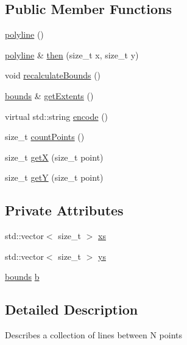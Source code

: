 \subsection*{Public Member Functions}
\begin{DoxyCompactItemize}
\item 
\hyperlink{classgraphics_1_1polyline_adbfa69d4679508481af8b7ad988c589f}{polyline} ()
\item 
\hyperlink{classgraphics_1_1polyline}{polyline} \& \hyperlink{classgraphics_1_1polyline_a611ffde054960b79df394c2fc957e25c}{then} (size\+\_\+t x, size\+\_\+t y)
\item 
void \hyperlink{classgraphics_1_1polyline_a43d93bfba6da374097c31d99fd4e6536}{recalculate\+Bounds} ()
\item 
\hyperlink{classgraphics_1_1bounds}{bounds} \& \hyperlink{classgraphics_1_1polyline_a5d1bb7507881d2d755d6779c9d7f8dbc}{get\+Extents} ()
\item 
virtual std\+::string \hyperlink{classgraphics_1_1polyline_a4b21b290bd04cccef24f8cb4a85299f2}{encode} ()
\item 
size\+\_\+t \hyperlink{classgraphics_1_1polyline_ab4556c8d21b8e07eaf1f3df023e032ac}{count\+Points} ()
\item 
size\+\_\+t \hyperlink{classgraphics_1_1polyline_af6fa13ff47cc4ba271583720dfca5af3}{getX} (size\+\_\+t point)
\item 
size\+\_\+t \hyperlink{classgraphics_1_1polyline_accded087eed0e5bcb72b4e22553aaa86}{getY} (size\+\_\+t point)
\end{DoxyCompactItemize}
\subsection*{Private Attributes}
\begin{DoxyCompactItemize}
\item 
std\+::vector$<$ size\+\_\+t $>$ \hyperlink{classgraphics_1_1polyline_a9a61c2ecc0a47024a115fd1b196ef7d3}{xs}
\item 
std\+::vector$<$ size\+\_\+t $>$ \hyperlink{classgraphics_1_1polyline_a864909f189748ca967b33068d1a5d8e0}{ys}
\item 
\hyperlink{classgraphics_1_1bounds}{bounds} \hyperlink{classgraphics_1_1polyline_aa5cf3a624c2571bb89dc1c85435e7a78}{b}
\end{DoxyCompactItemize}


\subsection{Detailed Description}
Describes a collection of lines between \textquotesingle{}N\textquotesingle{} points 

